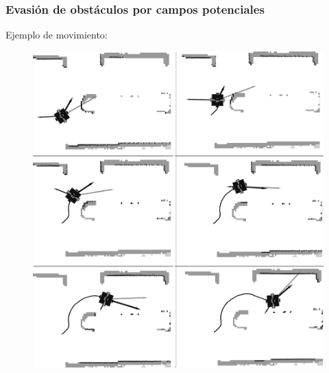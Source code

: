 \begin{frame}\frametitle{Evasión de obstáculos por campos potenciales}
  Ejemplo de movimiento:
  \begin{figure}
    \centering
    \includegraphics[height=0.85\textheight]{Figures/PotFieldsExecution.png}
  \end{figure}
\end{frame}

